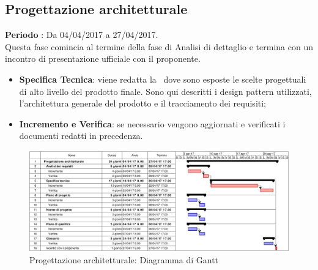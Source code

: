 \documentclass[../PianoDiProgetto.tex]{subfiles}
\begin{document}
	
	
		\subsection{Progettazione architetturale}
		\textbf{Periodo} : Da 04/04/2017 a 27/04/2017. \\
		Questa fase comincia al termine della fase di Analisi di dettaglio e termina con un incontro di presentazione ufficiale con il proponente.
		\begin{itemize}
			\item \textbf{Specifica Tecnica}: viene redatta la \specificatecnica\ dove sono esposte le scelte progettuali di alto livello del prodotto finale. Sono qui descritti i design pattern utilizzati, l'architettura generale del prodotto e il tracciamento dei requisiti;
			\item \textbf{Incremento e Verifica}: se necessario vengono aggiornati e verificati i documenti redatti in precedenza.
		\end{itemize}
		\begin{figure}[H]
			\centering
			\includegraphics[scale=0.55]{Figures/Gantt_ProgettazioneArchitetturale}
			\caption{Progettazione architetturale: Diagramma di Gantt}
		\end{figure}
		
		
		
\end{document}
